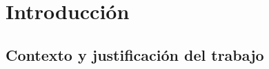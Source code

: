 \documentclass[IB,BIB]{TFUOC}%
\begin{document}
% 





\chapter{Introducción}


\section{Contexto y justificación del trabajo}

\end{document}
